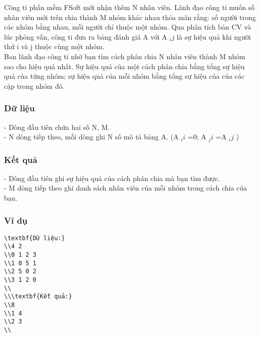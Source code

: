 







   Công ti phần mềm FSoft mới nhận thêm N nhân viên. Lãnh đạo công ti muốn số nhân viên mới trên chia thành M nhóm khác nhau thỏa mãn rằng: số người trong các nhóm bằng nhau, mỗi người chỉ thuộc một nhóm. Qua phân tích bản CV và lúc phỏng vấn, công ti đưa ra bảng đánh giá A với A   $_    ij   $   là sự hiệu quả khi người thứ i và j thuộc cùng một nhóm.   
\\   Ban lãnh đạo công ti nhờ bạn tìm cách phân chia N nhân viên thành M nhóm sao cho hiệu quả nhất. Sự hiệu quả của một cách phân chia bằng tổng sự hiệu quả của từng nhóm; sự hiệu quả của mỗi nhóm bằng tổng sự hiệu của của các cặp trong nhóm đó.  

\subsubsection{   Dữ liệu  }

   - Dòng đầu tiên chứa hai số N, M.   
\\   - N dòng tiếp theo, mỗi dòng ghi N số mô tả bảng A. (A   $_    ii   $   =0; A   $_    ji   $   =A   $_    ij   $   )  

\subsubsection{   Kết quả  }

   - Dòng đầu tiên ghi sự hiệu quả của cách phân chia mà bạn tìm được.   
\\   - M dòng tiếp theo ghi danh sách nhân viên của mỗi nhóm trong cách chia của bạn.  

\subsubsection{   Ví dụ  }
\begin{verbatim}
\textbf{Dữ liệu:}
\\4 2
\\0 1 2 3
\\1 0 5 1
\\2 5 0 2
\\3 1 2 0
\\
\\\textbf{Kết quả:}
\\8
\\1 4
\\2 3
\\\end{verbatim}

